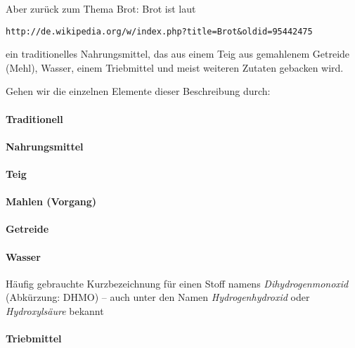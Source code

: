 \documentclass{scrbook}
\begin{document}
Aber zurück zum Thema Brot: Brot ist laut \begin{verbatim}http://de.wikipedia.org/w/index.php?title=Brot&oldid=95442475\end{verbatim} ein traditionelles Nahrungsmittel, das aus einem Teig aus gemahlenem Getreide (Mehl), Wasser, einem Triebmittel und meist weiteren Zutaten gebacken wird.

Gehen wir die einzelnen Elemente dieser Beschreibung durch:

\paragraph{Traditionell} %

\paragraph{Nahrungsmittel} %

\paragraph{Teig} %

\paragraph{Mahlen (Vorgang)} %

\paragraph{Getreide} %

\paragraph{Wasser} Häufig gebrauchte Kurzbezeichnung für einen Stoff namens \emph{Dihydrogenmonoxid} (Abkürzung: DHMO) -- auch unter den Namen \emph{Hydrogenhydroxid} oder \emph{Hydroxylsäure} bekannt

\paragraph{Triebmittel} %
\end{document}
